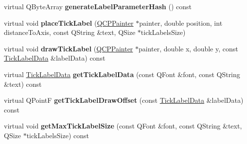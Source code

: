 \begin{DoxyCompactItemize}
virtual Q\+Byte\+Array {\bfseries generate\+Label\+Parameter\+Hash} () const
\item 
\mbox{\label{class_q_c_p_axis_painter_private_a829170e248b76a226a68e28f36d8ba6c}} 
virtual void {\bfseries place\+Tick\+Label} (\hyperlink{class_q_c_p_painter}{Q\+C\+P\+Painter} $\ast$painter, double position, int distance\+To\+Axis, const Q\+String \&text, Q\+Size $\ast$tick\+Labels\+Size)
\item 
\mbox{\label{class_q_c_p_axis_painter_private_a3a343b7ffbf09f978b79a0af8971dad7}} 
virtual void {\bfseries draw\+Tick\+Label} (\hyperlink{class_q_c_p_painter}{Q\+C\+P\+Painter} $\ast$painter, double x, double y, const \hyperlink{struct_q_c_p_axis_painter_private_1_1_tick_label_data}{Tick\+Label\+Data} \&label\+Data) const
\item 
\mbox{\label{class_q_c_p_axis_painter_private_ae71b3bd47d4b874f46c7258affb878bc}} 
virtual \hyperlink{struct_q_c_p_axis_painter_private_1_1_tick_label_data}{Tick\+Label\+Data} {\bfseries get\+Tick\+Label\+Data} (const Q\+Font \&font, const Q\+String \&text) const
\item 
\mbox{\label{class_q_c_p_axis_painter_private_aef24b8ac5fc9e2bb3a8bdb95508960cc}} 
virtual Q\+PointF {\bfseries get\+Tick\+Label\+Draw\+Offset} (const \hyperlink{struct_q_c_p_axis_painter_private_1_1_tick_label_data}{Tick\+Label\+Data} \&label\+Data) const
\item 
\mbox{\label{class_q_c_p_axis_painter_private_a70f68712f3b867cafafa59e72cd7f256}} 
virtual void {\bfseries get\+Max\+Tick\+Label\+Size} (const Q\+Font \&font, const Q\+String \&text, Q\+Size $\ast$tick\+Labels\+Size) const
\end{DoxyCompactItemize}
